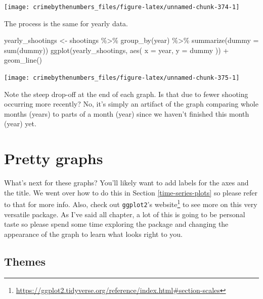 \documentclass[
]{krantz}
\makeatletter
\newenvironment{Shaded}{\begin{snugshade}}{\end{snugshade}}
\newcommand{\AttributeTok}[1]{\textcolor[rgb]{0.61,0.61,0.61}{#1}}
\newcommand{\FunctionTok}[1]{\textcolor[rgb]{0,0,0}{#1}}
\newcommand{\NormalTok}[1]{#1}
\newcommand{\OtherTok}[1]{\textcolor[rgb]{0.37,0.37,0.37}{#1}}
\newcommand{\SpecialCharTok}[1]{\textcolor[rgb]{0,0,0}{#1}}
\renewcommand{\href}[2]{#2\footnote{\url{#1}}}
\newenvironment{kframe}{%
\medskip{}
\setlength{\fboxsep}{.8em}
 \def\at@end@of@kframe{}%
 \ifinner\ifhmode%
  \def\at@end@of@kframe{\end{minipage}}%
  \begin{minipage}{\columnwidth}%
 \fi\fi%
 \def\FrameCommand##1{\hskip\@totalleftmargin \hskip-\fboxsep
 \colorbox{shadecolor}{##1}\hskip-\fboxsep
     \hskip-\linewidth \hskip-\@totalleftmargin \hskip\columnwidth}%
 \MakeFramed {\advance\hsize-\width
   \@totalleftmargin\z@ \linewidth\hsize
   \@setminipage}}%
 {\par\unskip\endMakeFramed%
 \at@end@of@kframe}
\renewenvironment{Shaded}{\begin{kframe}}{\end{kframe}}
\makeatother
\begin{document}
\begin{center}\texttt{[image: crimebythenumbers\_files/figure-latex/unnamed-chunk-374-1]} \end{center}

The process is the same for yearly data.

\begin{Shaded}
\begin{Highlighting}[]
\NormalTok{yearly\_shootings }\OtherTok{\textless{}{-}}\NormalTok{ shootings }\SpecialCharTok{\%\textgreater{}\%}
  \FunctionTok{group\_by}\NormalTok{(year) }\SpecialCharTok{\%\textgreater{}\%}
  \FunctionTok{summarize}\NormalTok{(}\AttributeTok{dummy =} \FunctionTok{sum}\NormalTok{(dummy))}
\FunctionTok{ggplot}\NormalTok{(yearly\_shootings, }\FunctionTok{aes}\NormalTok{(}
  \AttributeTok{x =}\NormalTok{ year,}
  \AttributeTok{y =}\NormalTok{ dummy}
\NormalTok{)) }\SpecialCharTok{+}
  \FunctionTok{geom\_line}\NormalTok{()}
\end{Highlighting}
\end{Shaded}

\begin{center}\texttt{[image: crimebythenumbers\_files/figure-latex/unnamed-chunk-375-1]} \end{center}

Note the steep drop-off at the end of each graph. Is that
due to fewer shooting occurring more recently? No, it's
simply an artifact of the graph comparing whole months
(years) to parts of a month (year) since we haven't finished
this month (year) yet.

\hypertarget{pretty-graphs}{%
\section{Pretty graphs}\label{pretty-graphs}}

What's next for these graphs? You'll likely want to add
labels for the axes and the title. We went over how to do
this in Section \ref{time-series-plots} so please refer to
that for more info. Also, check out \texttt{ggplot2}'s
\href{https://ggplot2.tidyverse.org/reference/index.html\#section-scales}{website}
to see more on this very versatile package. As I've said all
chapter, a lot of this is going to be personal taste so
please spend some time exploring the package and changing
the appearance of the graph to learn what looks right to
you.

\hypertarget{themes}{%
\subsection{Themes}\label{themes}}
\end{document}
